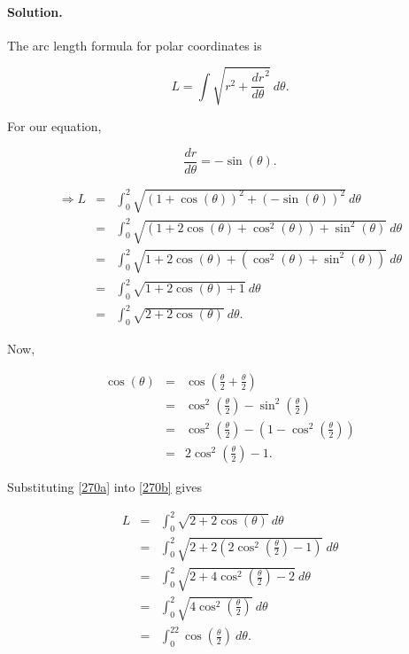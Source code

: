 

\paragraph{Solution.} The arc length formula for polar coordinates is

\[L=\int{\sqrt{r^2+\frac{dr}{d\theta}^2}~d\theta.}\]

For our equation,

\[\frac{dr}{d\theta}=-\sin\left(\theta\right).\]

\begin{eqnarray}
	\Rightarrow L&=&\int_0^2\sqrt{\left(1+\cos\left(\theta\right)\right)^2+\left(-\sin\left(\theta\right)\right)^2}~d\theta\nonumber\\
	&=&\int_0^2\sqrt{\left(1+2\cos\left(\theta\right)+\cos^2\left(\theta\right)\right)+\sin^2\left(\theta\right)}~d\theta\nonumber\\
	&=&\int_0^2\sqrt{1+2\cos\left(\theta\right)+\left(\cos^2\left(\theta\right)+\sin^2\left(\theta\right)\right)}~d\theta\nonumber\\
	&=&\int_0^2\sqrt{1+2\cos\left(\theta\right)+1}~d\theta\nonumber\\
	&=&\int_0^2\sqrt{2+2\cos\left(\theta\right)}~d\theta.\label{270b}
\end{eqnarray}

Now,

\begin{eqnarray}
	\cos\left(\theta\right)&=&\cos\left(\frac{\theta}{2}+\frac{\theta}{2}\right)\nonumber\\
	&=&\cos^2\left(\frac{\theta}{2}\right)-\sin^2\left(\frac{\theta}{2}\right)\nonumber\\
	&=&\cos^2\left(\frac{\theta}{2}\right)-\left(1-\cos^2\left(\frac{\theta}{2}\right)\right)\nonumber\\
	&=&2\cos^2\left(\frac{\theta}{2}\right)-1.\label{270a}
\end{eqnarray}

Substituting \vref{270a} into \vref{270b} gives

\begin{eqnarray*}
	L&=&\int_0^2\sqrt{2+2\cos\left(\theta\right)}~d\theta\\
	&=&\int_0^2\sqrt{2+2\left(2\cos^2\left(\frac{\theta}{2}\right)-1\right)}~d\theta\\
	&=&\int_0^2\sqrt{2+4\cos^2\left(\frac{\theta}{2}\right)-2}~d\theta\\
	&=&\int_0^2\sqrt{4\cos^2\left(\frac{\theta}{2}\right)}~d\theta\\
	&=&\int_0^22\cos\left(\frac{\theta}{2}\right)~d\theta.
\end{eqnarray*}

